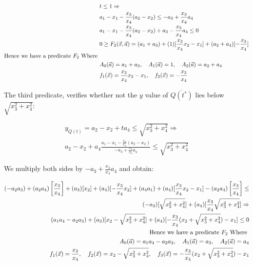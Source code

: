 \documentclass{article}
\begin{document}
\begin{align*}
    &t \le 1 \Rightarrow \\
    & a_1 - x_1 - \frac{x_3}{x_4} (a_2 - x_2) \le  - a_3 + \frac{x_3}{x_4}a_4 \\
    & a_1 - x_1 - \frac{x_3}{x_4} (a_2 - x_2) + a_3 - \frac{x_3}{x_4}a_4 \le 0 \\
    &0 \ge F_2(\vec{x}, \vec{a}) = (a_1 + a_3) + (1)[\frac{x_3}{x_4}x_2- x_1] + (a_2 + a_4) [ - \frac{x_3}{x_4} ] \\
    \textnormal{Hence we have a predicate } F_2 \textnormal{ Where } \\
    &A_0(\vec{a}) = a_1 + a_3, \quad A_1(\vec{a}) = 1,\quad A_2(\vec{a}) = a_2 + a_4 \\
    &f_1(\vec{x}) = \frac{x_3}{x_4}x_2- x_1,\quad f_2(\vec{x}) = - \frac{x_3}{x_4}
\end{align*}

The third predicate, verifies whether not the $y$ value of $\overline{Q(t^*)}$ lies below $\sqrt{x_3^2 + x_4^2}$:

\begin{align*}
    y_{Q(t)} = a_2 - x_2 + t a_4   \le \sqrt{x_3^2 + x_4^2} \Rightarrow \\
    a_2 - x_2 + a_4 \frac{   a_1 - x_1 - \frac{x_3}{x_4} (a_2 - x_2)}{ - a_3 + \frac{x_3}{x_4}a_4} \le \sqrt{x_3^2 + x_4^2} 
\end{align*}

We multiply both sides by $- a_3 + \frac{x_3}{x_4}a_4$ and obtain:


\begin{align*}
    (- a_2 a_3) +  (a_2 a_4) \left[\frac{x_3}{x_4}\right] +  (a_3)[x_2] + (a_4)[ - \frac{x_3}{x_4}x_2] + (a_4 a_1) + (a_4)[ \frac{x_3}{x_4}x_2 - x_1] - (a_2a_4)\left[\frac{x_3}{x_4}\right]
        \le \\
    (- a_3)[ \sqrt{x_3^2 + x_4^2} ] + (a_4) [\frac{x_3}{x_4} \sqrt{x_3^2 + x_4^2}] \Rightarrow \\
    (a_1 a_4 - a_2 a_3) + (a_3)[x_2 - \sqrt{x_3^2 + x_4^2}] + (a_4)[ - \frac{x_3}{x_4}( x_2 + \sqrt{x_3^2 + x_4^2}) -x_1 ] \le 0 \\
    \textnormal{Hence we have a predicate } F_2 \textnormal{ Where } \\
    A_0(\vec{a}) = a_1 a_4 - a_2 a_3, \quad A_1(\vec{a}) = a_3, \quad A_2(\vec{a}) = a_4 \\
   f_1(\vec{x}) = \frac{x_3}{x_4}, \quad f_2(\vec{x}) =  x_2 - \sqrt{x_3^2 + x_4^2}, \quad f_3(\vec{x}) = - \frac{x_3}{x_4}( x_2 + \sqrt{x_3^2 + x_4^2}) -x_1
\end{align*}
\end{document}
